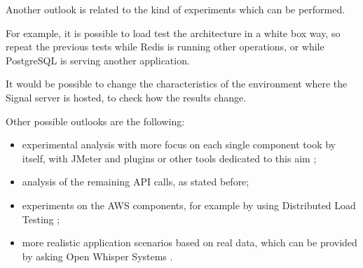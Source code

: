 Another outlook is related to the kind of experiments which can be performed.

For example, it is possible to load test the architecture in a white box way, so repeat the previous tests while Redis is running other operations, or while PostgreSQL is serving another application.

It would be possible to change the characteristics of the environment where the Signal server is hosted, to check how the results change.



Other possible outlooks are the following:
\begin{itemize}
    \item experimental analysis with more focus on each single component took by itself, with JMeter and plugins or other tools dedicated to this aim \cite{dubey_2019};
    \item analysis of the remaining API calls, as stated before;
    \item experiments on the AWS components, for example by using Distributed Load Testing \cite{king_dobner_2019};
    \item more realistic application scenarios based on real data, which can be provided by asking Open Whisper Systems \cite{wikipedia_2021}.
\end{itemize}